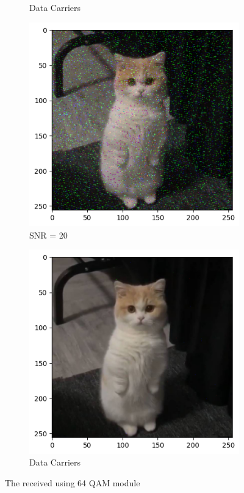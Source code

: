 \begin{figure}[htbp]
\begin{subfigure}[t]{0.49\linewidth}
        \caption{Data Carriers}
        \label{10db}
    \end{subfigure}
    \hfil
    \begin{subfigure}[t]{0.49\linewidth}
        \includegraphics[width=\linewidth]{../Source/results/output_20db.png}
        \caption{SNR = 20}
        \label{20db}
    \end{subfigure}
    \hfil
    \begin{subfigure}[t]{0.49\linewidth}
        \includegraphics[width=\linewidth]{../Source/results/output_30db.png}
        \caption{Data Carriers}
        \label{30db}
    \end{subfigure}
    \caption{The received using 64 QAM module}
\end{figure}